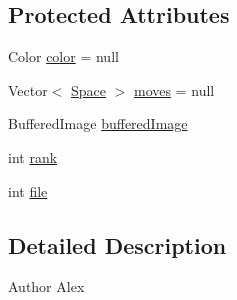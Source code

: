 \subsection*{Protected Attributes}
\begin{DoxyCompactItemize}
\item 
Color \hyperlink{classpiece_1_1Piece_a3b9829de5683f4c966f4a6c98ad77d65}{color} = null
\item 
Vector$<$ \hyperlink{classmodel_1_1Space}{Space} $>$ \hyperlink{classpiece_1_1Piece_ab29bfb629292cb4ae39a5dd545a31aaf}{moves} = null
\item 
Buffered\-Image \hyperlink{classpiece_1_1Piece_a287a5ae3797417dbc7a04def1bb8ceda}{buffered\-Image}
\item 
int \hyperlink{classpiece_1_1Piece_ac015e60596ce57e3f96328fc61f66b95}{rank}
\item 
int \hyperlink{classpiece_1_1Piece_af30351ae20932383ee93fdd2e73f65ec}{file}
\end{DoxyCompactItemize}


\subsection{Detailed Description}
\begin{DoxyAuthor}{Author}
Alex 
\end{DoxyAuthor}


